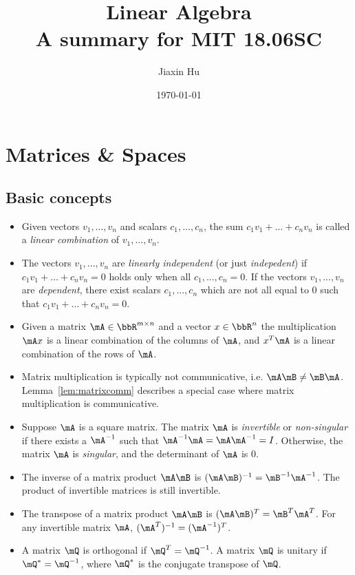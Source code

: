 \documentclass[11pt]{article}
\title{\textbf{Linear Algebra}\\A summary for MIT 18.06SC}
\date{\today}
\author{%
Jiaxin Hu
}
\theoremstyle{plain}
\theoremstyle{definition}
\begin{document}

\maketitle


\section{Matrices \& Spaces}
\subsection{Basic concepts}
\begin{itemize}
    \item Given vectors $v_1 ,...,v_n$ and scalars $c_1, ..., c_n$, the sum $c_1 v_1 + \dots + c_n v_n$ is called a \textit{linear combination} of $v_1,...,v_n$.
    \item The vectors  $v_1 ,...,v_n$  are \textit{linearly independent} (or just \textit{indepedent}) if $c_1 v_1 + \dots + c_n v_n = 0$ holds only when all  $c_1,...,c_n = 0$. If the vectors  $v_1 ,...,v_n$  are \textit{dependent}, there exist scalars $c_1, ..., c_n$ which are not all equal to 0 such that $c_1 v_1 + \dots + c_n v_n = 0$.
	\item Given a matrix $\mA \in \bbR^{m \times n}$ and a vector $x \in \bbR^{n}$  the multiplication $\mA x$ is a linear combination of the columns of $\mA$, and $x^T \mA$ is a linear combination of the rows of $\mA$.
	\item Matrix multiplication is typically not communicative, i.e. $\mA \mB \neq \mB \mA$. Lemma~\ref{lem:matrixcomm} describes a special case where matrix multiplication is communicative.
	\item Suppose $\mA$ is a square matrix. The matrix $\mA$ is \textit{invertible} or \textit{non-singular} if there exists a $\mA^{-1}$ such that $\mA^{-1} \mA = \mA \mA^{-1} = I$. Otherwise, the matrix $\mA$ is \textit{singular}, and the determinant of $\mA$ is 0. 
	\item The inverse of a matrix product $\mA\mB$ is $(\mA \mB)^{-1} = \mB^{-1} \mA^{-1}$. The product of invertible matrices is still invertible.
	\item The transpose of a matrix product  $\mA\mB$ is $(\mA \mB)^{T} = \mB^{T} \mA^{T}$. For any invertible matrix $\mA$, $(\mA^T)^{-1} = (\mA^{-1})^T$.
	\item A matrix $\mQ$ is orthogonal if $\mQ^T = \mQ^{-1}$. A matrix $\mQ$ is unitary if $\mQ^* = \mQ^{-1}$, where $\mQ^*$ is the conjugate transpose of $\mQ$.
\end{itemize}
\end{document}
